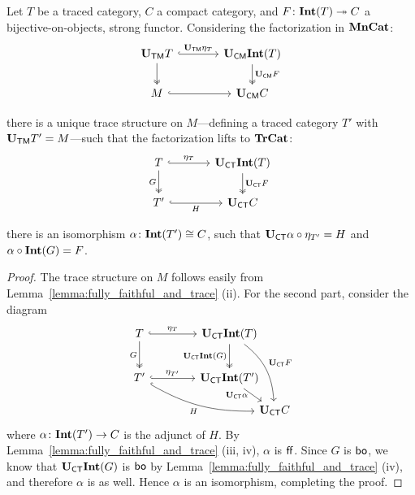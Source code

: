 \documentclass[11pt,oneside,article]{memoir}
\begin{document}
\begin{lemma}\label{lem:Tr_bo_Int}
   Let $T$ be a traced category, $C$ a compact category, and $F\colon\mathbf{Int}(T)\twoheadrightarrow C$ a
   bijective-on-objects, strong functor. Considering the factorization in $\mathbf{MnCat}$:
   \begin{equation*}
      \begin{tikzcd}[column sep=large]
         \UTM T \ar[r,hook,"\UTM\eta_{T}"] \ar[d,two heads]
            & \UCM\Int(T) \ar[d,two heads,"\UCM F"] \\
         M \ar[r,hook] & \UCM C
      \end{tikzcd}
   \end{equation*}
   \begin{compactitem}
      \item there is a unique trace structure on $M$---defining a traced category $T'$ with $\mathbf{U}_{\mathsf{TM}}
         T'=M$---such that the factorization lifts to $\mathbf{TrCat}$:
         \begin{equation*}
            \begin{tikzcd}[column sep=large]
               T \ar[r,hook,"\eta_{T}"] \ar[d,two heads,"G"']
                  & \UCT\Int(T) \ar[d,two heads,"\UCT F"] \\
               T' \ar[r,hook,"H"'] & \UCT C
            \end{tikzcd}
         \end{equation*}
      \item there is an isomorphism $\alpha\colon\mathbf{Int}(T')\cong C$, such that $\mathbf{U}_{\mathsf{CT}}\alpha\circ
         \eta_{T'}=H$ and $\alpha\circ\mathbf{Int}(G)=F$.
   \end{compactitem}
\end{lemma}
\begin{proof}
   The trace structure on $M$ follows easily from Lemma~\ref{lemma:fully_faithful_and_trace} (ii).
   For the second part, consider the diagram
   \begin{equation*}
      \begin{tikzcd}[column sep=4em, row sep=5ex]
         T \ar[r,hook,"\eta_{T}"] \ar[d,two heads,"G"']
            & \UCT\Int(T) \ar[d,two heads,"\UCT\Int(G)"']
               \ar[ddr,bend left=25,"\UCT F"] &[between origins] \\
         T' \ar[r,hook,"\eta_{T'}"] \ar[drr,hook,bend right=15,"H"']
            & \UCT\Int(T') \ar[dr,"\UCT\alpha"' {inner sep=0pt,pos=.25}] & \\[-10]
         &&\UCT C
      \end{tikzcd}
   \end{equation*}
   where $\alpha\colon\mathbf{Int}(T')\to C$ is the adjunct of $H$. By
   Lemma~\ref{lemma:fully_faithful_and_trace} (iii, iv), $\alpha$ is $\mathsf{ff}$. Since $G$ is $\mathsf{bo}$, we
   know that $\mathbf{U}_{\mathsf{CT}}\mathbf{Int}(G)$ is $\mathsf{bo}$ by Lemma~\ref{lemma:fully_faithful_and_trace} (iv), and
   therefore $\alpha$ is as well. Hence $\alpha$ is an isomorphism, completing the proof.
\end{proof}
\end{document}
